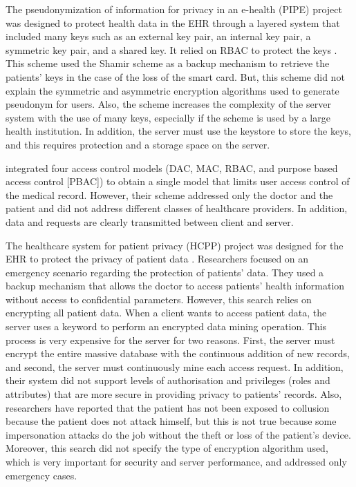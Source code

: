 \documentclass[journal,article,submit,moreauthors,pdftex]{Definitions/mdpi}
\begin{document}
The pseudonymization of information for privacy in an e-health (PIPE) project was designed to protect health data in the EHR through a layered system that included many keys such as an external key pair, an internal key pair, a symmetric key pair, and a shared key. It relied on RBAC to protect the keys \cite{fp2}. This scheme used the Shamir scheme as a backup mechanism to retrieve the patients' keys in the case of the loss of the smart card. But, this scheme did not explain the symmetric and asymmetric encryption algorithms used to generate pseudonym for users. Also, the scheme increases the complexity of the server system with the use of many keys, especially if the scheme is used by a large health institution. In addition, the server must use the keystore to store the keys, and this requires protection and a storage space on the server.

\citet{fp12} integrated four access control models (DAC, MAC, RBAC, and purpose based access control [PBAC]) to obtain a single model that limits user access control of the medical record. However, their scheme addressed only the doctor and the patient and did not address different classes of healthcare providers. In addition, data and requests are clearly transmitted between client and server.

The healthcare system for patient privacy (HCPP) project was designed for the EHR to protect the privacy of patient data \cite{fp13}. Researchers focused on an emergency scenario regarding the protection of patients' data.  They used a backup mechanism that allows the doctor to access patients' health information without access to confidential parameters. However, this search relies on encrypting all patient data. When a client wants to access patient data, the server uses a keyword to perform an encrypted data mining operation. This process is very expensive for the server for two reasons. First, the server must encrypt the entire massive database with the continuous addition of new records, and second, the server must continuously mine each access request.  In addition, their system did not support levels of authorisation and privileges (roles and attributes) that are more secure in providing privacy to patients' records. Also, researchers have reported that the patient has not been exposed to collusion because the patient does not attack himself, but this is not true because some impersonation attacks do the job without the theft or loss of the patient's device. Moreover, this search did not specify the type of encryption algorithm used, which is very important for security and server performance, and addressed only emergency cases.
\end{document}
